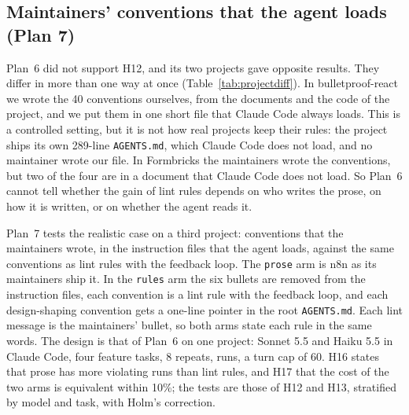 \documentclass[pdflatex,sn-basic]{sn-jnl}
\newcommand{\file}[1]{\texttt{#1}}
\newcommand{\arm}[1]{\texttt{#1}}
\begin{document}
\subsection{Maintainers' conventions that the agent loads (Plan 7)}
\label{sec:plan7}

Plan~6 did not support H12, and its two projects gave opposite results.
They differ in more than one way at once (Table~\ref{tab:projectdiff}).
In bulletproof-react we wrote the 40 conventions ourselves, from the documents and the code of the project, and we put them in one short file that Claude Code always loads.
This is a controlled setting, but it is not how real projects keep their rules: the project ships its own 289-line \file{AGENTS.md}, which Claude Code does not load, and no maintainer wrote our file.
In Formbricks the maintainers wrote the conventions, but two of the four are in a document that Claude Code does not load.
So Plan~6 cannot tell whether the gain of lint rules depends on who writes the prose, on how it is written, or on whether the agent reads it.

Plan~7 tests the realistic case on a third project: conventions that the maintainers wrote, in the instruction files that the agent loads, against the same conventions as lint rules with the feedback loop.
The \arm{prose} arm is n8n as its maintainers ship it.
In the \arm{rules} arm the six bullets are removed from the instruction files, each convention is a lint rule with the feedback loop, and each design-shaping convention gets a one-line pointer in the root \file{AGENTS.md}.
Each lint message is the maintainers' bullet, so both arms state each rule in the same words.
The design is that of Plan~6 on one project: Sonnet 5.5 and Haiku 5.5 in Claude Code, four feature tasks, 8 repeats, \PSevenRuns{} runs, a turn cap of 60.
H16 states that prose has more violating runs than lint rules, and H17 that the cost of the two arms is equivalent within 10\%; the tests are those of H12 and H13, stratified by model and task, with Holm's correction.
\end{document}
